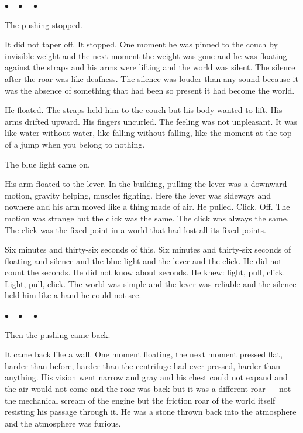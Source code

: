 \documentclass[12pt, letterpaper]{article}
\begin{document}
\begin{center}
$\bullet\quad\bullet\quad\bullet$
\end{center}

The pushing stopped.

It did not taper off. It stopped. One moment he was pinned to the couch by invisible weight and the next moment the weight was gone and he was floating against the straps and his arms were lifting and the world was silent. The silence after the roar was like deafness. The silence was louder than any sound because it was the absence of something that had been so present it had become the world.

He floated. The straps held him to the couch but his body wanted to lift. His arms drifted upward. His fingers uncurled. The feeling was not unpleasant. It was like water without water, like falling without falling, like the moment at the top of a jump when you belong to nothing.

The blue light came on.

His arm floated to the lever. In the building, pulling the lever was a downward motion, gravity helping, muscles fighting. Here the lever was sideways and nowhere and his arm moved like a thing made of air. He pulled. Click. Off. The motion was strange but the click was the same. The click was always the same. The click was the fixed point in a world that had lost all its fixed points.

Six minutes and thirty-six seconds of this. Six minutes and thirty-six seconds of floating and silence and the blue light and the lever and the click. He did not count the seconds. He did not know about seconds. He knew: light, pull, click. Light, pull, click. The world was simple and the lever was reliable and the silence held him like a hand he could not see.

\begin{center}
$\bullet\quad\bullet\quad\bullet$
\end{center}

Then the pushing came back.

It came back like a wall. One moment floating, the next moment pressed flat, harder than before, harder than the centrifuge had ever pressed, harder than anything. His vision went narrow and gray and his chest could not expand and the air would not come and the roar was back but it was a different roar --- not the mechanical scream of the engine but the friction roar of the world itself resisting his passage through it. He was a stone thrown back into the atmosphere and the atmosphere was furious.
\end{document}
